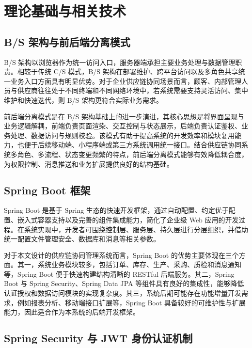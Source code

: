 \chapter{理论基础与相关技术}

\section{B/S 架构与前后端分离模式}

B/S 架构以浏览器作为统一访问入口，服务器端承担主要业务处理与数据管理职责。相较于传统 C/S 模式，B/S 架构在部署维护、跨平台访问以及多角色共享统一业务入口方面具有明显优势。对于企业供应链协同场景而言，顾客、内部管理人员与供应商往往处于不同终端和不同网络环境中，若系统需要支持灵活访问、集中维护和快速迭代，则 B/S 架构更符合实际业务需求。

前后端分离模式是在 B/S 架构基础上的进一步演进，其核心思想是将界面呈现与业务逻辑解耦，前端负责页面渲染、交互控制与状态展示，后端负责认证鉴权、业务处理、数据访问与规则校验。该模式有助于提高系统的开发效率和模块复用能力，也便于后续移动端、小程序端或第三方系统调用统一接口。结合供应链协同系统多角色、多流程、状态变更频繁的特点，前后端分离模式能够有效降低耦合度，为权限控制、消息推送和业务扩展提供良好的结构基础\citep{fielding2000architectural}。

\section{Spring Boot 框架}

Spring Boot 是基于 Spring 生态的快速开发框架，通过自动配置、约定优于配置、嵌入式容器支持以及完善的组件集成能力，简化了企业级 Web 应用的开发过程\citep{springbootdocs}。在系统实现中，开发者可围绕控制层、服务层、持久层进行分层组织，并借助统一配置文件管理安全、数据库和消息等相关参数。

对于本文设计的供应链协同管理系统而言，Spring Boot 的优势主要体现在三个方面。其一，系统业务模块较多，包括订单、库存、生产、采购、质检和消息通知等，Spring Boot 便于快速构建结构清晰的 RESTful 后端服务。其二，Spring Boot 与 Spring Security、Spring Data JPA 等组件具有良好的集成性，能够降低认证授权和数据访问模块的实现复杂度。其三，系统后期可能存在功能增量开发需求，例如报表分析、移动端接口扩展等，Spring Boot 具备较好的可维护性与扩展能力，因此适合作为本系统的后端开发框架。

\section{Spring Security 与 JWT 身份认证机制}

